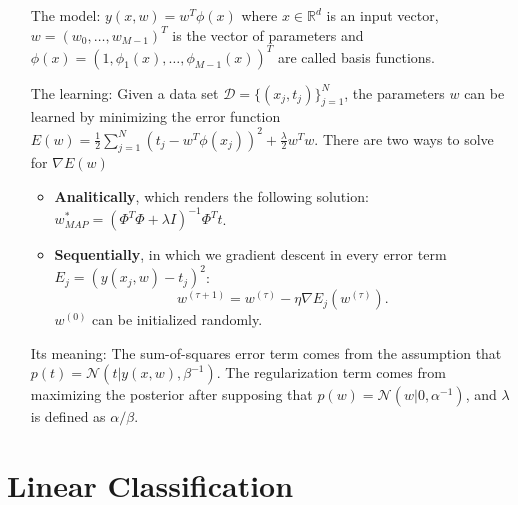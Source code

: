 \documentclass{report}
\begin{document}
\begin{itemize}
	\item[The model:] $y(x,w) = w^{T}\phi(x)$ where $x\in\mathbb{R}^d$ is an input vector, $w = (w_0,\dots,w_{M-1})^T$ is the vector of parameters and $\phi(x) = (1, \phi_1(x), \dots, \phi_{M-1}(x))^T$ are called basis functions.

	\item[The learning:] Given a data set $\mathcal{D} = \{(x_j,t_j)\}_{j=1}^N$, the parameters $w$ can be learned by minimizing the error function $E(w) = \frac{1}{2}\sum_{j=1}^N(t_j - w^T\phi(x_j))^2 + \frac{\lambda}{2}w^Tw$. There are two ways to solve for $\nabla E(w)$
	\begin{itemize}
		\item \textbf{Analitically}, which renders the following solution: $w^*_{MAP} = (\Phi^T\Phi + \lambda I)^{-1}\Phi^Tt$.
		\item \textbf{Sequentially}, in which we gradient descent in every error term 
		$E_j = (y(x_j,w) - t_j)^2$: \[w^{(\tau + 1)} = w^{(\tau)} - \eta\nabla E_j(w^{(\tau)}).\] $w^{(0)}$ can be initialized randomly.
	\end{itemize}

	\item[Its meaning:] The sum-of-squares error term comes from the assumption that $p(t) = \mathcal{N}(t|y(x,w), \beta^{-1})$. The regularization term comes from maximizing the posterior after supposing that $p(w) = \mathcal{N}(w|0, \alpha^{-1})$, and $\lambda$ is defined as $\alpha/\beta$.
\end{itemize}

\chapter{Linear Classification}
\end{document}
